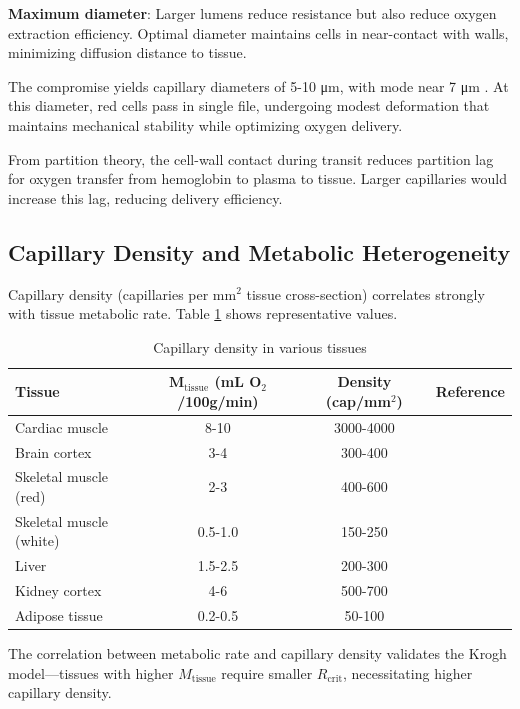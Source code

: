\textbf{Maximum diameter}: Larger lumens reduce resistance but also reduce oxygen extraction efficiency. Optimal diameter maintains cells in near-contact with walls, minimizing diffusion distance to tissue.

The compromise yields capillary diameters of 5-10 μm, with mode near 7 μm \cite{zweifach1973morphometric}. At this diameter, red cells pass in single file, undergoing modest deformation that maintains mechanical stability while optimizing oxygen delivery.

From partition theory, the cell-wall contact during transit reduces partition lag for oxygen transfer from hemoglobin to plasma to tissue. Larger capillaries would increase this lag, reducing delivery efficiency.

\subsection{Capillary Density and Metabolic Heterogeneity}

Capillary density (capillaries per mm$^{2}$ tissue cross-section) correlates strongly with tissue metabolic rate. Table \ref{tab:capillary_density} shows representative values.

\begin{table}[h]
\centering
\caption{Capillary density in various tissues}
\label{tab:capillary_density}
\begin{tabular}{lccc}
\toprule
\textbf{Tissue} & \textbf{$\boldsymbol{M_{\mathrm{tissue}}}$ (mL O$_{2}$/100g/min)} & \textbf{Density (cap/mm$^{2}$)} & \textbf{Reference} \\
\midrule
Cardiac muscle & 8-10 & 3000-4000 & \cite{rakusan1971quantitative} \\
Brain cortex & 3-4 & 300-400 & \cite{pawlik1981quantitative} \\
Skeletal muscle (red) & 2-3 & 400-600 & \cite{hudlicka1992muscle} \\
Skeletal muscle (white) & 0.5-1.0 & 150-250 & \cite{hudlicka1992muscle} \\
Liver & 1.5-2.5 & 200-300 & \cite{rappaport1973hepatic} \\
Kidney cortex & 4-6 & 500-700 & \cite{beeuwkes1975renal} \\
Adipose tissue & 0.2-0.5 & 50-100 & \cite{crandall1997microvascular} \\
\bottomrule
\end{tabular}
\end{table}

The correlation between metabolic rate and capillary density validates the Krogh model—tissues with higher $M_{\mathrm{tissue}}$ require smaller $R_{\mathrm{crit}}$, necessitating higher capillary density.

